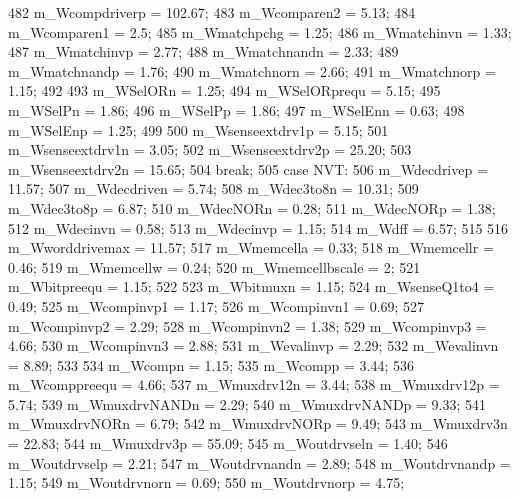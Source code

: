 \begin{DoxyCode}
{{{482                 m_Wcompdriverp = 102.67;
483                 m_Wcomparen2 = 5.13;
484                 m_Wcomparen1 = 2.5;
485                 m_Wmatchpchg = 1.25;
486                 m_Wmatchinvn = 1.33;
487                 m_Wmatchinvp = 2.77;
488                 m_Wmatchnandn = 2.33;
489                 m_Wmatchnandp = 1.76;
490                 m_Wmatchnorn = 2.66;
491                 m_Wmatchnorp = 1.15;
492 
493                 m_WSelORn = 1.25;
494                 m_WSelORprequ = 5.15;
495                 m_WSelPn = 1.86;
496                 m_WSelPp = 1.86;
497                 m_WSelEnn = 0.63;
498                 m_WSelEnp = 1.25;
499 
500                 m_Wsenseextdrv1p = 5.15;
501                 m_Wsenseextdrv1n = 3.05;
502                 m_Wsenseextdrv2p = 25.20;
503                 m_Wsenseextdrv2n = 15.65;
504                 break;
505             case NVT:
506                 m_Wdecdrivep = 11.57;
507                 m_Wdecdriven = 5.74;
508                 m_Wdec3to8n = 10.31;
509                 m_Wdec3to8p = 6.87;
510                 m_WdecNORn = 0.28;
511                 m_WdecNORp = 1.38;
512                 m_Wdecinvn = 0.58;
513                 m_Wdecinvp = 1.15;
514                 m_Wdff = 6.57;
515 
516                 m_Wworddrivemax = 11.57;
517                 m_Wmemcella = 0.33;
518                 m_Wmemcellr = 0.46;
519                 m_Wmemcellw = 0.24;
520                 m_Wmemcellbscale = 2;
521                 m_Wbitpreequ = 1.15;
522 
523                 m_Wbitmuxn = 1.15;
524                 m_WsenseQ1to4 = 0.49;
525                 m_Wcompinvp1 = 1.17;
526                 m_Wcompinvn1 = 0.69;
527                 m_Wcompinvp2 = 2.29;
528                 m_Wcompinvn2 = 1.38;
529                 m_Wcompinvp3 = 4.66;
530                 m_Wcompinvn3 = 2.88;
531                 m_Wevalinvp = 2.29;
532                 m_Wevalinvn = 8.89;
533 
534                 m_Wcompn = 1.15;
535                 m_Wcompp = 3.44;
536                 m_Wcomppreequ = 4.66;
537                 m_Wmuxdrv12n = 3.44;
538                 m_Wmuxdrv12p = 5.74;
539                 m_WmuxdrvNANDn = 2.29;
540                 m_WmuxdrvNANDp = 9.33;
541                 m_WmuxdrvNORn = 6.79;
542                 m_WmuxdrvNORp = 9.49;
543                 m_Wmuxdrv3n = 22.83;
544                 m_Wmuxdrv3p = 55.09;
545                 m_Woutdrvseln = 1.40;
546                 m_Woutdrvselp = 2.21;
547                 m_Woutdrvnandn = 2.89;
548                 m_Woutdrvnandp = 1.15;
549                 m_Woutdrvnorn = 0.69;
550                 m_Woutdrvnorp = 4.75;
}}}
\end{DoxyCode}
